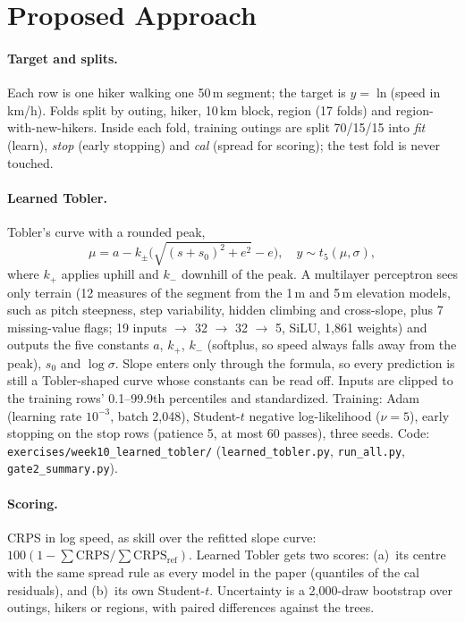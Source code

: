 \documentclass[10pt,twocolumn,letterpaper]{article}
\begin{document}
\section{Proposed Approach}
\label{sec:approach}

\paragraph{Target and splits.} Each row is one hiker walking one 50\,m segment; the target is $y=\ln$(speed in km/h). Folds split by outing, hiker, 10\,km block, region (17 folds) and region-with-new-hikers. Inside each fold, training outings are split 70/15/15 into \emph{fit} (learn), \emph{stop} (early stopping) and \emph{cal} (spread for scoring); the test fold is never touched.

\paragraph{Learned Tobler.} Tobler's curve with a rounded peak,
\begin{equation}
\mu = a - k_{\pm}\big(\sqrt{(s+s_0)^2+e^2}-e\big),\quad y\sim t_{5}(\mu,\sigma),
\end{equation}
where $k_{+}$ applies uphill and $k_{-}$ downhill of the peak. A multilayer perceptron sees only terrain (12 measures of the segment from the 1\,m and 5\,m elevation models, such as pitch steepness, step variability, hidden climbing and cross-slope, plus 7 missing-value flags; 19 inputs $\to$ 32 $\to$ 32 $\to$ 5, SiLU, 1{,}861 weights) and outputs the five constants $a$, $k_{+}$, $k_{-}$ (softplus, so speed always falls away from the peak), $s_0$ and $\log\sigma$. Slope enters only through the formula, so every prediction is still a Tobler-shaped curve whose constants can be read off. Inputs are clipped to the training rows' 0.1--99.9th percentiles and standardized. Training: Adam (learning rate $10^{-3}$, batch 2{,}048), Student-$t$ negative log-likelihood ($\nu=5$), early stopping on the stop rows (patience 5, at most 60 passes), three seeds. Code: \texttt{exercises/week10\_learned\_tobler/} (\texttt{learned\_tobler.py}, \texttt{run\_all.py}, \texttt{gate2\_summary.py}).

\paragraph{Scoring.} CRPS in log speed, as skill over the refitted slope curve: $100(1-\sum\mathrm{CRPS}/\sum\mathrm{CRPS}_{\text{ref}})$. Learned Tobler gets two scores: (a)~its centre with the same spread rule as every model in the paper (quantiles of the cal residuals), and (b)~its own Student-$t$. Uncertainty is a 2{,}000-draw bootstrap over outings, hikers or regions, with paired differences against the trees.
\end{document}

